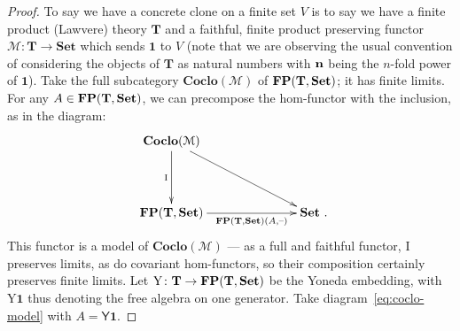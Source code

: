 \documentclass[11pt, a4paper, twoside,leqno]{amsart}
\newcommand{\cat}[1]{\mathbf{#1}}
\newcommand{\thg}{{\mathord{\text{--}}}}
\newcommand{\defeq}{\mathrel{\mathop:}=}
\newcommand{\cd}[2][]{\vcenter{\hbox{\xymatrix#1{#2}}}}
\numberwithin{equation}{section}
\theoremstyle{plain}
\theoremstyle{definition}
\newcommand{\Set}{\cat{Set}}
\newcommand{\aone}{{\mathbf 1}}
\DeclareMathOperator{\FP}{\bf FP}
\begin{document}
\begin{proof}
  To say we have a concrete clone on a finite set \(V\) is to say we
have a finite
product (Lawvere) theory \(\cat{T}\) and a
faithful, finite product preserving functor \(\mathcal{M} \colon \cat{T} \rightarrow \Set\) which sends
  \(\aone\) to \(V\) (note that we are observing the usual convention of
  considering the objects of \(\cat{T}\) as natural numbers with
  \({\bf n}\) being the \(n\)-fold power of \(\aone\)).
  Take the full subcategory
  \( \cat{Coclo}(\mathcal{M})\) of \(\FP(\cat{T}, \cat{Set})\); it has
  finite limits. For any \(A \in \FP(\cat{T},\Set)\), we can
  precompose
  the hom-functor with the inclusion, as in the diagram:
  \begin{equation}
    \label{eq:coclo-model}
    \xymatrixcolsep{6pc}
    \xymatrixrowsep{3.5pc}
    \cd{
      {\cat{Coclo}(\mathcal{M})} \ar[d]_-{\mathrm{I}
      } \ar[dr]
      & \\
      {\FP(\cat{T},\Set)} \ar[r]_-{\FP(\cat{T},\Set)(
        A,\thg)
      } & {\Set}
      \rlap{ .}
    }
  \end{equation}
  This functor is a model of \(\cat{Coclo}(\mathcal{M})\) ---  as a full
  and faithful functor, \(\mathrm{I} \) preserves limits, as do
  covariant hom-functors, so their composition certainly preserves
  finite limits. Let
  \(\mathrm{Y} \colon \cat{T} \rightarrow \FP(\cat{T},\Set)\) be the
  Yoneda embedding, with \(\mathrm{Y}\aone\) thus denoting the free
  algebra on one generator. Take diagram~\eqref{eq:coclo-model} with
  \(A = \mathsf{Y}\aone\).


\end{proof}
\end{document}

